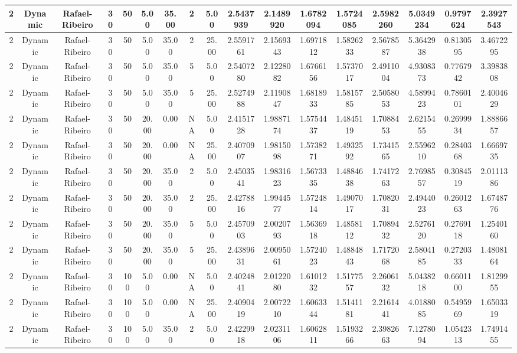 \documentclass[a4paper]{article}
\begin{document}
\begin{center}
\begin{tabular}{ | c | c | c | c | c | c | c | c | c | c | c | c | c | c | c | c | c | }
		2	&	Dynamic	&	Rafael-Ribeiro	&	30	&	50	&	5.00	&	35.00	&	2	&	5.00	&	2.5437939	&	2.1489920	&	1.6782094	&	1.5724085	&	2.5982260	&	5.0349234	&	0.9797624	&	2.3927543 \\
		\hline
		2	&	Dynamic	&	Rafael-Ribeiro	&	30	&	50	&	5.00	&	35.00	&	2	&	25.00	&	2.5591761	&	2.1569343	&	1.6971812	&	1.5826233	&	2.5678587	&	5.3642938	&	0.8130595	&	3.4672295 \\
		\hline
		2	&	Dynamic	&	Rafael-Ribeiro	&	30	&	50	&	5.00	&	35.00	&	5	&	5.00	&	2.5407280	&	2.1228082	&	1.6766156	&	1.5737017	&	2.4911004	&	4.9308373	&	0.7767942	&	3.3983808 \\
		\hline
		2	&	Dynamic	&	Rafael-Ribeiro	&	30	&	50	&	5.00	&	35.00	&	5	&	25.00	&	2.5274988	&	2.1190847	&	1.6818933	&	1.5815785	&	2.5058053	&	4.5899423	&	0.7860101	&	2.4004629 \\
		\hline
		2	&	Dynamic	&	Rafael-Ribeiro	&	30	&	50	&	20.00	&	0.00	&	NA	&	5.00	&	2.4151728	&	1.9887174	&	1.5754437	&	1.4845119	&	1.7088453	&	2.6215455	&	0.2699934	&	1.8886657 \\
		\hline
		2	&	Dynamic	&	Rafael-Ribeiro	&	30	&	50	&	20.00	&	0.00	&	NA	&	25.00	&	2.4070907	&	1.9815098	&	1.5738271	&	1.4932592	&	1.7341565	&	2.5596210	&	0.2840368	&	1.6669735 \\
		\hline
		2	&	Dynamic	&	Rafael-Ribeiro	&	30	&	50	&	20.00	&	35.00	&	2	&	5.00	&	2.4503541	&	1.9831623	&	1.5673335	&	1.4884638	&	1.7417263	&	2.7698557	&	0.3084519	&	2.0111386 \\
		\hline
		2	&	Dynamic	&	Rafael-Ribeiro	&	30	&	50	&	20.00	&	35.00	&	2	&	25.00	&	2.4278816	&	1.9944577	&	1.5724814	&	1.4907017	&	1.7082031	&	2.4944023	&	0.2601263	&	1.6748776 \\
		\hline
		2	&	Dynamic	&	Rafael-Ribeiro	&	30	&	50	&	20.00	&	35.00	&	5	&	5.00	&	2.4570903	&	2.0020793	&	1.5636918	&	1.4858112	&	1.7089432	&	2.5276120	&	0.2769118	&	1.2540160 \\
		\hline
		2	&	Dynamic	&	Rafael-Ribeiro	&	30	&	50	&	20.00	&	35.00	&	5	&	25.00	&	2.4389631	&	2.0095061	&	1.5724023	&	1.4884843	&	1.7172068	&	2.5804185	&	0.2720333	&	1.4808164 \\
		\hline
		2	&	Dynamic	&	Rafael-Ribeiro	&	30	&	100	&	5.00	&	0.00	&	NA	&	5.00	&	2.4024841	&	2.0122080	&	1.6101232	&	1.5177557	&	2.2606132	&	5.0438218	&	0.6601100	&	1.8129955 \\
		\hline
		2	&	Dynamic	&	Rafael-Ribeiro	&	30	&	100	&	5.00	&	0.00	&	NA	&	25.00	&	2.4090419	&	2.0072210	&	1.6063344	&	1.5141181	&	2.2161441	&	4.0188085	&	0.5495969	&	1.6503319 \\
		\hline
		2	&	Dynamic	&	Rafael-Ribeiro	&	30	&	100	&	5.00	&	35.00	&	2	&	5.00	&	2.4229918	&	2.0231106	&	1.6062811	&	1.5193266	&	2.3982663	&	7.1278094	&	1.0542313	&	1.7491455 \\

\end{tabular}
\end{center}
\end{document}
